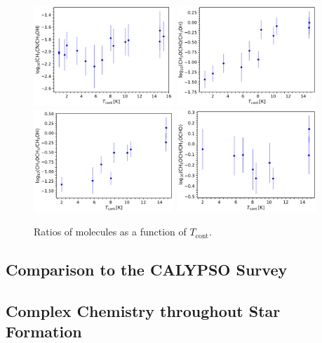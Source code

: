 \documentclass[twocolumn]{aastex62}
\begin{document}
\begin{figure}[htbp!]
  \centering
  \includegraphics[width=0.47\textwidth]{ratio_ch3cn_ch3oh_tcont.pdf}
  \includegraphics[width=0.47\textwidth]{ratio_ch3ocho_ch3oh_tcont.pdf}
  \includegraphics[width=0.47\textwidth]{ratio_ch3och3_ch3oh_tcont.pdf}
  \includegraphics[width=0.47\textwidth]{ratio_ch3och3_ch3ocho_tcont.pdf}
  \caption{Ratios of molecules as a function of $T_\text{cont}$.}
  \label{fig:ratio_tcont}
\end{figure}
\subsection{Comparison to the CALYPSO Survey}
\subsection{Complex Chemistry throughout Star Formation}
\end{document}
